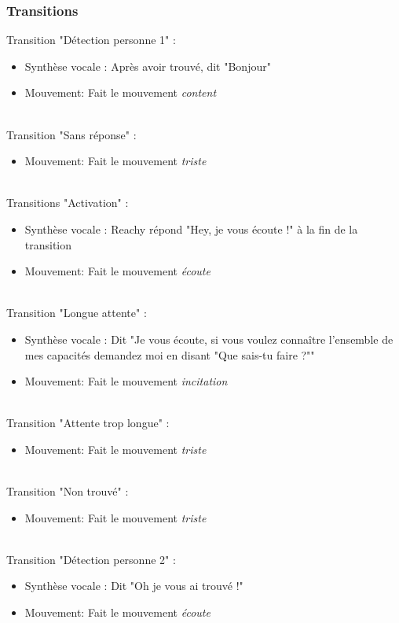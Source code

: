 \subsubsection{Transitions}
\vspace{0.2cm}
\noindent Transition "Détection personne 1" :
\begin{itemize}
    \item Synthèse vocale : Après avoir trouvé, dit "Bonjour"
    \item Mouvement: Fait le mouvement \textit{content}
\end{itemize} 
\ \\
Transition "Sans réponse" :
\begin{itemize}
    \item Mouvement: Fait le mouvement \textit{triste}
\end{itemize}
\ \\
Transitions "Activation" : 
\begin{itemize}
    \item Synthèse vocale : Reachy répond "Hey, je vous écoute !" à la fin de la transition
    \item Mouvement: Fait le mouvement \textit{écoute}
\end{itemize}
\ \\
Transition "Longue attente" : 
\begin{itemize}
    \item Synthèse vocale : Dit "Je vous écoute, si vous voulez connaître l'ensemble de mes capacités demandez moi en disant "Que sais-tu faire ?""
    \item Mouvement: Fait le mouvement \textit{incitation}
\end{itemize}
\ \\
Transition "Attente trop longue" : 
\begin{itemize}
    \item Mouvement: Fait le mouvement \textit{triste}
\end{itemize}
\ \\
Transition "Non trouvé" :
\begin{itemize}
    \item Mouvement: Fait le mouvement \textit{triste}
\end{itemize}
\ \\
Transition "Détection personne 2" : 
\begin{itemize}
    \item Synthèse vocale : Dit "Oh je vous ai trouvé !"
    \item Mouvement: Fait le mouvement \textit{écoute}
\end{itemize}

